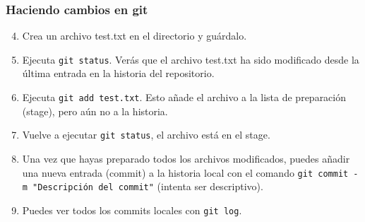 \documentclass[mathserif, 10pt]{beamer}
\begin{document}
\begin{frame}\frametitle{Haciendo cambios en git}
\begin{enumerate}\setcounter{enumi}{3}
\item Crea un archivo test.txt en el directorio y guárdalo.
\item Ejecuta \texttt{git status}. Verás que el archivo test.txt ha sido modificado desde la última entrada en la historia del repositorio.
\item Ejecuta \texttt{git add test.txt}. Esto añade el archivo a la lista de preparación (stage), pero aún no a la historia.
\item Vuelve a ejecutar \texttt{git status}, el archivo está en el stage.
\item Una vez que hayas preparado todos los archivos modificados, puedes añadir una nueva entrada (commit) a la historia local con el comando \texttt{git commit -m "Descripción del commit"} (intenta ser descriptivo).
\item Puedes ver todos los commits locales con \texttt{git log}.
\end{enumerate}
    

\end{frame}
\end{document}
